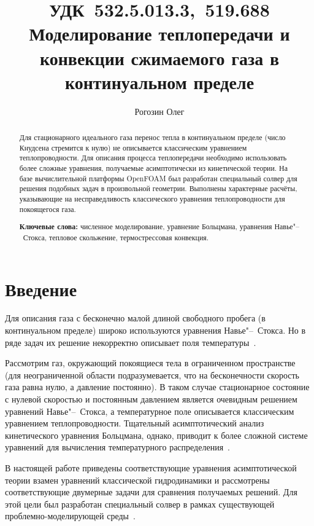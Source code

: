 \documentclass[english,russian,a4paper,10pt]{article}
\title{
	\hbox{\normalsize УДК 532.5.013.3, 519.688}\hbox{}
	Моделирование теплопередачи и конвекции сжимаемого газа в континуальном пределе
}
\author{Рогозин Олег}
\date{}
\begin{document}
\maketitle
\begin{abstract}
	Для стационарного идеального газа перенос тепла в континуальном пределе (число Кнудсена стремится к нулю)
	не описывается классическим уравнением теплопроводности. Для описания процесса теплопередачи необходимо
	использовать более сложные уравнения, получаемые асимптотически из кинетической теории.
	На базе вычислительной платформы OpenFOAM\textregistered{} был разработан специальный солвер
	для решения подобных задач в произвольной геометрии.
	Выполнены характерные расчёты, указывающие на несправедливость классического уравнения теплопроводности
	для покоящегося газа.

	\hbox{}\noindent \textbf{Ключевые слова:}
	численное моделирование, уравнение Больцмана, уравнения Навье"--~Стокса, тепловое скольжение, термострессовая конвекция.
\end{abstract}


\section{Введение}

Для описания газа с бесконечно малой длиной свободного пробега (в континуальном пределе)
широко используются уравнения Навье"--~Стокса.
Но в ряде задач их решение некорректно описывает поля температуры~\cite{Kogan1976,Bobylev1996}.

Рассмотрим газ, окружающий покоящиеся тела в ограниченном пространстве
(для неограниченной области подразумевается, что на бесконечности скорость газа равна нулю, а давление постоянно).
В таком случае стационарное состояние с нулевой скоростью и постоянным давлением является
очевидным решением уравнений Навье"--~Стокса, а температурное поле описывается
классическим уравнением теплопроводности.
Тщательный асимптотический анализ кинетического уравнения Больцмана, однако, приводит
к более сложной системе уравнений для вычисления температурного распределения~\cite{Bobylev1996}.

В настоящей работе приведены соответствующие уравнения асимптотической теории взамен
уравнений классической гидродинамики и рассмотрены соответствующие двумерные задачи для сравнения
получаемых решений. Для этой цели был разработан специальный солвер в рамках существующей
проблемно-моделирующей среды~\cite{Rogozin2011, Martynov2011}.
\end{document}
